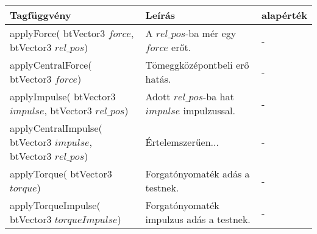 \documentclass[12p,a4paper,notitlepage]{scrartcl}
\begin{document}
\begin{tabular}{|p{65mm}|p{85mm}|p{20mm}|}
\hline
Tagfüggvény & Leírás & alapérték \\
\hline 
\hline 
applyForce( \newline
btVector3 $force$, \newline
btVector3 $rel\_pos$) & A $rel\_pos$-ba mér egy $force$ erőt. & - \\
\hline
applyCentralForce( \newline
btVector3 $force$) & Tömeggközépontbeli erő hatás. & - \\
\hline
applyImpulse( \newline 
btVector3 $impulse$, \newline
btVector3 $rel\_pos$) & Adott $rel\_pos$-ba hat $impulse$ impulzussal. & -\\
\hline
applyCentralImpulse(\newline 
btVector3 $impulse$, \newline 
btVector3 $rel\_pos$) & Értelemszerűen... & - \\
\hline
applyTorque(\newline 
btVector3 $torque$) & Forgatónyomaték adás a testnek. & - \\
\hline
applyTorqueImpulse( \newline
btVector3 $torqueImpulse$) & Forgatónyomaték impulzus adás a testnek. & - \\
\hline
\end{tabular}
\end{document}
